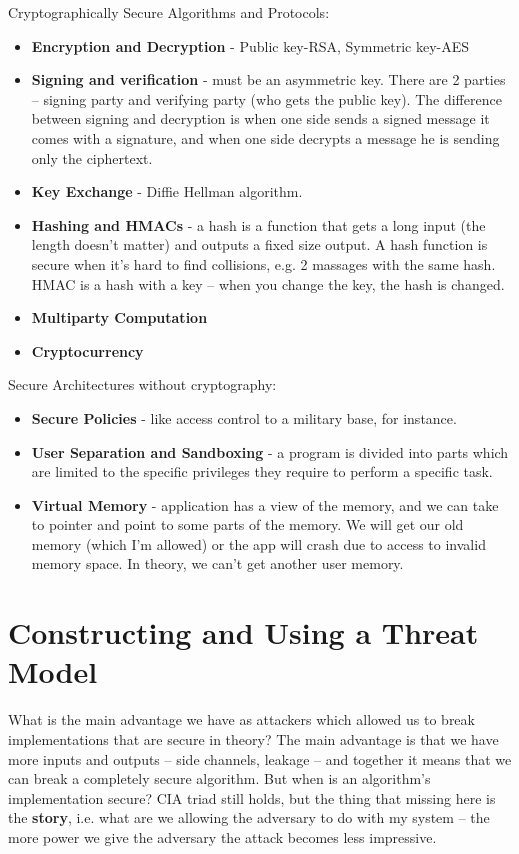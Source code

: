Cryptographically Secure Algorithms and Protocols:
\begin{itemize}
    \item \textbf{Encryption and Decryption} - Public key-RSA, Symmetric key-AES
    \item \textbf{Signing and verification} - must be an asymmetric key. There are 2 parties – signing party and verifying party (who gets the public key). The difference between signing and decryption is when one side sends a signed message it comes with a signature, and when one side decrypts a message he is sending only the ciphertext.
    \item \textbf{Key Exchange} - Diffie Hellman algorithm.
    \item \textbf{Hashing and HMACs} - a hash is a function that gets a long input (the length doesn't matter) and outputs a fixed size output. A hash function is secure when it's hard to find collisions, e.g. 2 massages with the same hash. HMAC is a hash with a key – when you change the key, the hash is changed.
    \item \textbf{Multiparty Computation}
    \item \textbf{Cryptocurrency}
\end{itemize}

Secure Architectures without cryptography:
\begin{itemize}
    \item \textbf{Secure Policies} - like access control to a military base, for instance.
    \item \textbf{User Separation and Sandboxing} - a program is divided into parts which are limited to the specific privileges they require to perform a specific task.
    \item \textbf{Virtual Memory} - application has a view of the memory, and we can take to pointer and point to some parts of the memory. We will get our old memory (which I'm allowed) or the app will crash due to access to invalid memory space. In theory, we can't get another user memory.
\end{itemize}

\section{Constructing and Using a Threat Model} \label{sec:BreakImpl}

What is the main advantage we have as attackers which allowed us to break implementations that are secure in theory?
The main advantage is that we have more inputs and outputs – side channels, leakage – and together it means that we can break a completely secure algorithm. 
But when is an algorithm's implementation secure? CIA triad still holds, but the thing that missing here is the \textbf{story}, i.e. what are we allowing the adversary to do with my system – the more power we give the adversary the attack becomes less impressive. 

